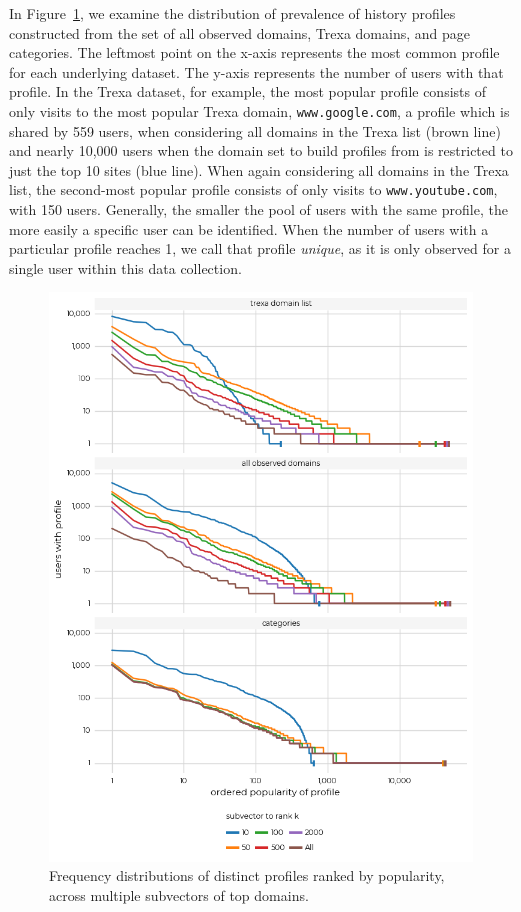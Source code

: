 \documentclass[letterpaper,twocolumn,10pt]{article}
\begin{document}
In Figure~\ref{fig:profile_popularity}, we examine the distribution of prevalence of history profiles constructed from the set of all observed domains, Trexa domains, and page categories. 
The leftmost point on the x-axis represents the most common profile for each underlying dataset. 
The y-axis represents the number of users with that profile. 
In the Trexa dataset, for example, the most popular profile consists of only visits to the most popular Trexa domain, \texttt{www.google.com}, a profile which is shared by 559 users, when considering all domains in the Trexa list (brown line) and nearly 10,000 users when the domain set to build profiles from is restricted to just the top 10 sites (blue line). 
When again considering all domains in the Trexa list, the second-most popular profile consists of only visits to \texttt{www.youtube.com}, with 150 users.
Generally, the smaller the pool of users with the same profile, the more easily a specific user can be identified.
When the number of users with a particular profile reaches 1, we call that profile \textit{unique}, as it is only observed for a single user within this data collection. 
\begin{figure}[ht]
    \centering
    \includegraphics[width=\linewidth]{figures/4-popularity-by-k.png}
    \caption{Frequency distributions of distinct profiles ranked by popularity, across multiple subvectors of top domains.}
    \label{fig:profile_popularity}
\end{figure}
\end{document}

